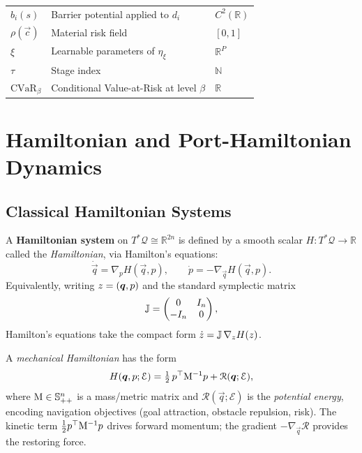\begin{table}[h]
\begin{tabular}{lll}
$b_i(s)$                    & Barrier potential applied to $d_i$        & $C^2(\mathbb{R})$ \\
$\rho(\vec{c})$             & Material risk field                       & $[0,1]$ \\
$\xi$                       & Learnable parameters of $\eta_\xi$        & $\mathbb{R}^P$ \\
$\tau$                      & Stage index                               & $\mathbb{N}$ \\
$\mathrm{CVaR}_\beta$       & Conditional Value-at-Risk at level $\beta$ & $\mathbb{R}$ \\
\bottomrule
\end{tabular}
\end{table}

\section{Hamiltonian and Port-Hamiltonian Dynamics}
\label{sec:prelim:hamiltonian}

\subsection{Classical Hamiltonian Systems}
\label{subsec:prelim:classical_ham}

A \textbf{Hamiltonian system} on $T^*\mathcal{Q} \cong \mathbb{R}^{2n}$
is defined by a smooth scalar $H : T^*\mathcal{Q} \to \mathbb{R}$ called the
\emph{Hamiltonian}, via Hamilton's equations:
\begin{equation}
  \dot{\vec{q}} = \nabla_p H(\vec{q},p), \qquad
  \dot{p}       = -\nabla_{\vec{q}} H(\vec{q},p).
  \label{eq:hamilton_eqs}
\end{equation}
Equivalently, writing $z = (\boldsymbol{q},p)$ and the standard
symplectic matrix
\begin{equation}
  \mathbb{J} = \begin{pmatrix} 0 & I_n \\ -I_n & 0 \end{pmatrix},
  \label{eq:symplectic_matrix}
\end{equation}
Hamilton's equations take the compact form
$\dot{z} = \mathbb{J}\,\nabla_z H(z)$.

\begin{definition}
\label{def:mech_hamiltonian}
A \emph{mechanical Hamiltonian} has the form
\begin{equation}
  H(\boldsymbol{q},p;\mathcal{E})
  = \tfrac{1}{2}\,p^\top \mathrm{M}^{-1} p
    + \mathcal{R}(\boldsymbol{q};\mathcal{E}),
  \label{eq:mech_hamiltonian}
\end{equation}
where $\mathrm{M} \in \mathbb{S}^n_{++}$ is a mass/metric matrix and
$\mathcal{R}(\vec{q};\mathcal{E})$ is the \emph{potential energy},
encoding navigation objectives (goal attraction, obstacle repulsion, risk).
The kinetic term $\frac{1}{2}p^\top\mathrm{M}^{-1}p$ drives forward momentum;
the gradient $-\nabla_{\vec{q}}\mathcal{R}$ provides the restoring force.
\end{definition}

